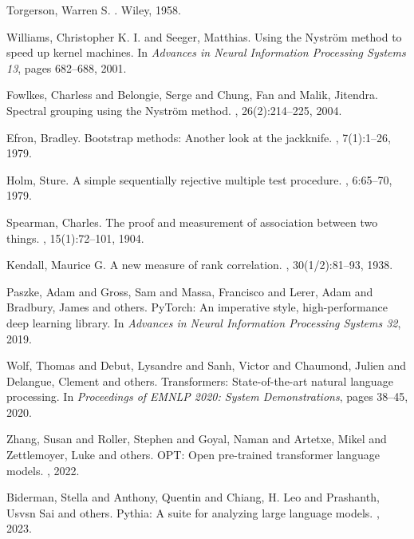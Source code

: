 \documentclass[11pt]{article}
\newcommand{\1}{\mathbf{1}}
\begin{document}
\begin{thebibliography}{99}
Torgerson, Warren S.
.
\newblock Wiley, 1958.

Williams, Christopher K. I. and Seeger, Matthias.
\newblock Using the Nystr\"om method to speed up kernel machines.
\newblock In {\em Advances in Neural Information Processing Systems 13}, pages 682--688, 2001.

Fowlkes, Charless and Belongie, Serge and Chung, Fan and Malik, Jitendra.
\newblock Spectral grouping using the Nystr\"om method.
, 26(2):214--225, 2004.

Efron, Bradley.
\newblock Bootstrap methods: Another look at the jackknife.
, 7(1):1--26, 1979.

Holm, Sture.
\newblock A simple sequentially rejective multiple test procedure.
, 6:65--70, 1979.

Spearman, Charles.
\newblock The proof and measurement of association between two things.
, 15(1):72--101, 1904.

Kendall, Maurice G.
\newblock A new measure of rank correlation.
, 30(1/2):81--93, 1938.

Paszke, Adam and Gross, Sam and Massa, Francisco and Lerer, Adam and Bradbury, James and others.
\newblock PyTorch: An imperative style, high-performance deep learning library.
\newblock In {\em Advances in Neural Information Processing Systems 32}, 2019.

Wolf, Thomas and Debut, Lysandre and Sanh, Victor and Chaumond, Julien and Delangue, Clement and others.
\newblock Transformers: State-of-the-art natural language processing.
\newblock In {\em Proceedings of EMNLP 2020: System Demonstrations}, pages 38--45, 2020.

Zhang, Susan and Roller, Stephen and Goyal, Naman and Artetxe, Mikel and Zettlemoyer, Luke and others.
\newblock OPT: Open pre-trained transformer language models.
, 2022.

Biderman, Stella and Anthony, Quentin and Chiang, H. Leo and Prashanth, Usvsn Sai and others.
\newblock Pythia: A suite for analyzing large language models.
, 2023.


\end{thebibliography}
\end{document}
